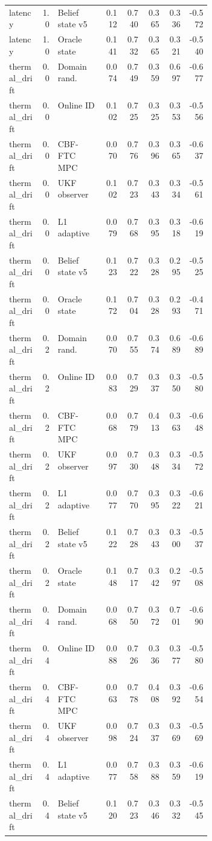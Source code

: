 \documentclass{article}
\begin{document}
\begin{center}
\begin{longtable}{p{0.16\linewidth}rp{0.23\linewidth}rrrrr}
latency & 1.0 & Belief state v5 & 0.112 & 0.740 & 0.365 & 0.336 & -0.572\\
latency & 1.0 & Oracle state & 0.141 & 0.732 & 0.365 & 0.321 & -0.540\\
thermal\_drift & 0.0 & Domain rand. & 0.074 & 0.749 & 0.359 & 0.697 & -0.677\\
thermal\_drift & 0.0 & Online ID & 0.102 & 0.725 & 0.325 & 0.353 & -0.556\\
thermal\_drift & 0.0 & CBF-FTC MPC & 0.070 & 0.776 & 0.396 & 0.365 & -0.637\\
thermal\_drift & 0.0 & UKF observer & 0.102 & 0.723 & 0.343 & 0.334 & -0.561\\
thermal\_drift & 0.0 & L1 adaptive & 0.079 & 0.768 & 0.395 & 0.318 & -0.619\\
thermal\_drift & 0.0 & Belief state v5 & 0.123 & 0.722 & 0.328 & 0.295 & -0.525\\
thermal\_drift & 0.0 & Oracle state & 0.172 & 0.704 & 0.328 & 0.293 & -0.471\\
thermal\_drift & 0.2 & Domain rand. & 0.070 & 0.755 & 0.374 & 0.689 & -0.689\\
thermal\_drift & 0.2 & Online ID & 0.083 & 0.729 & 0.337 & 0.350 & -0.580\\
thermal\_drift & 0.2 & CBF-FTC MPC & 0.068 & 0.779 & 0.413 & 0.363 & -0.648\\
thermal\_drift & 0.2 & UKF observer & 0.097 & 0.730 & 0.348 & 0.334 & -0.572\\
thermal\_drift & 0.2 & L1 adaptive & 0.077 & 0.770 & 0.395 & 0.322 & -0.621\\
thermal\_drift & 0.2 & Belief state v5 & 0.122 & 0.728 & 0.343 & 0.300 & -0.537\\
thermal\_drift & 0.2 & Oracle state & 0.148 & 0.717 & 0.342 & 0.297 & -0.508\\
thermal\_drift & 0.4 & Domain rand. & 0.068 & 0.750 & 0.372 & 0.701 & -0.690\\
thermal\_drift & 0.4 & Online ID & 0.088 & 0.726 & 0.336 & 0.377 & -0.580\\
thermal\_drift & 0.4 & CBF-FTC MPC & 0.063 & 0.778 & 0.408 & 0.392 & -0.654\\
thermal\_drift & 0.4 & UKF observer & 0.098 & 0.724 & 0.337 & 0.369 & -0.569\\
thermal\_drift & 0.4 & L1 adaptive & 0.077 & 0.758 & 0.388 & 0.359 & -0.619\\
thermal\_drift & 0.4 & Belief state v5 & 0.120 & 0.723 & 0.346 & 0.332 & -0.545\\

\end{longtable}
\end{center}
\end{document}
